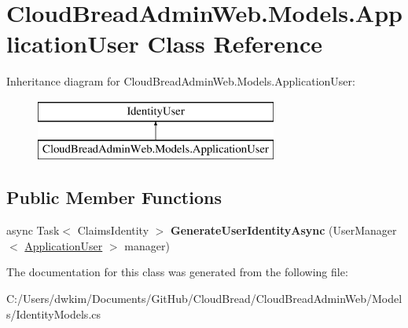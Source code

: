 \hypertarget{a00018}{}\section{Cloud\+Bread\+Admin\+Web.\+Models.\+Application\+User Class Reference}
\label{a00018}
Inheritance diagram for Cloud\+Bread\+Admin\+Web.\+Models.\+Application\+User\+:\begin{figure}[H]
\begin{center}
\leavevmode
\includegraphics[height=2.000000cm]{a00018}
\end{center}
\end{figure}
\subsection*{Public Member Functions}
\begin{DoxyCompactItemize}
\item 
async Task$<$ Claims\+Identity $>$ {\bfseries Generate\+User\+Identity\+Async} (User\+Manager$<$ \hyperlink{a00018}{Application\+User} $>$ manager)\hypertarget{a00018_a18c626164316c53c14d4a2cc3b48bc45}{}\label{a00018_a18c626164316c53c14d4a2cc3b48bc45}

\end{DoxyCompactItemize}


The documentation for this class was generated from the following file\+:\begin{DoxyCompactItemize}
\item 
C\+:/\+Users/dwkim/\+Documents/\+Git\+Hub/\+Cloud\+Bread/\+Cloud\+Bread\+Admin\+Web/\+Models/Identity\+Models.\+cs\end{DoxyCompactItemize}
